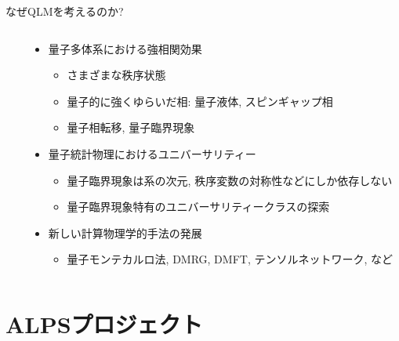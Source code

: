 \begin{frame}{なぜQLMを考えるのか?}
\begin{columns}[T]
\begin{column}{.2\textwidth}
    \end{column}
    \begin{column}{.8\textwidth}
      \begin{itemize}
      \item 量子多体系における強相関効果
        \begin{itemize}
        \item さまざまな秩序状態
        \item 量子的に強くゆらいだ相: 量子液体, スピンギャップ相
        \item 量子相転移, 量子臨界現象
        \end{itemize}
      \item 量子統計物理におけるユニバーサリティー
        \begin{itemize}
        \item 量子臨界現象は系の次元, 秩序変数の対称性などにしか依存しない
        \item 量子臨界現象特有のユニバーサリティークラスの探索
        \end{itemize}
      \item 新しい計算物理学的手法の発展
        \begin{itemize}
        \item 量子モンテカルロ法, DMRG, DMFT, テンソルネットワーク, など
        \end{itemize}
      \end{itemize}
    \end{column}
  \end{columns}
\end{frame}


  
\section{ALPSプロジェクト}

